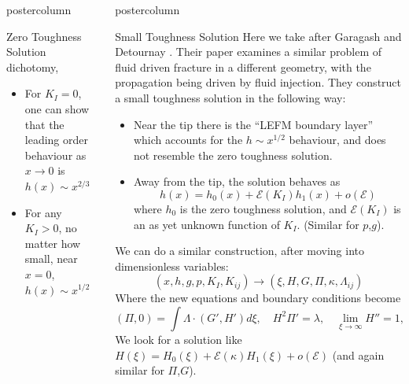 \documentclass{beamer}
\newcommand{\cE}{\mathcal{E}}                               %
\newlength{\columnheight}
\begin{document}
\begin{frame}
\begin{columns}
\begin{column}{.43\textwidth}
\begin{beamercolorbox}[center]{postercolumn}
\begin{minipage}{.98\textwidth}
{\begin{myblock}{Zero Toughness Solution}
dichotomy,
\begin{itemize}
\item For $K_I=0$, one can show that the leading order behaviour
      as $x\to 0$ is $h(x) \sim x^{2/3}$
\item For any $K_I > 0$, no matter how small, near $x=0$, $h(x)\sim x^{1/2}$
\end{itemize}
\end{myblock}\vfill
}\end{minipage}\end{beamercolorbox}
\end{column}
\begin{column}{.57\textwidth}
\begin{beamercolorbox}[center]{postercolumn}
\begin{minipage}{.98\textwidth} %
\parbox[t][\columnheight]{\textwidth}{ %
\begin{myblock}{Small Toughness Solution}
Here we take after Garagash and Detournay \cite{GandD}. Their paper examines
a similar problem of fluid driven fracture in a different geometry, with the
propagation being driven by fluid injection. They construct a small toughness
solution in the following way:
\begin{itemize}
\item Near the tip there is the ``LEFM boundary layer'' which accounts for the
      $h \sim x^{1/2}$ behaviour, and does not resemble the zero toughness 
     solution.
\item Away from the tip, the solution behaves as 
      \[h(x) = h_0(x) + \cE(K_I)h_1(x)+o(\cE)\]
      where $h_0$ is  the zero toughness solution, and $\cE(K_I)$ is an
      as yet unknown function of $K_I$. (Similar for $p$,$g$).
\end{itemize}
We can do a similar construction, after moving into dimensionless variables:
\[(x,h,g,p,K_I,K_{ij}) \to (\xi, H,G,\Pi, \kappa, \Lambda_{ij}) \]
Where the new equations and boundary conditions become
\[(\Pi,0) = \int \Lambda \cdot (G',H') d\xi, \quad H^2\Pi' = \lambda, \quad
\lim_{\xi \to \infty} H'' = 1, \quad \lim_{\xi \to 0} 3\sqrt{2\pi}H' = \kappa \]
We look for a solution like $H(\xi) = H_0(\xi) + \cE(\kappa)
H_1(\xi)+o(\cE)$ (and again similar for $\Pi$,$G$).
\begin{figure}
\begin{minipage}{.52\textwidth}

\end{minipage}
\end{figure}
\end{myblock}}
\end{minipage}
\end{beamercolorbox}
\end{column}
\end{columns}
\end{frame}
\end{document}

